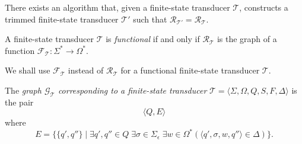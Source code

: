 \begin{proposition}
  There exists an algorithm that, given a finite-state transducer $\mathcal{T}$,
  constructs a trimmed finite-state transducer $\mathcal{T'}$ such that
  $\mathcal{R}_\mathcal{T'} = \mathcal{R}_\mathcal{T}$. 
\end{proposition}

\begin{definition}
  A finite-state transducer $\mathcal{T}$ is \emph{functional} if and only if
  $\mathcal{R}_\mathcal{T}$ is the graph of a function $\mathcal{F}_\mathcal{T} :
  \Sigma^* \rightarrow \Omega^*$.
\end{definition}

We shall use $\mathcal{F}_\mathcal{T}$ instead of $\mathcal{R}_\mathcal{T}$ for a functional finite-state transducer $\mathcal{T}$.

\begin{definition}
  The \emph{graph $\mathcal{G}_{\mathcal{T}}$ corresponding to a finite-state
  transducer} $\mathcal{T} = \langle \Sigma, \Omega, Q, S, F, \Delta \rangle$ is the
  pair
  \begin{equation*}
    \langle Q, E \rangle
  \end{equation*}
  where
  \begin{equation*}
    E = \{ \{ q', q'' \} \mid \exists q', q'' \in Q \; \exists \sigma \in
    \Sigma_\epsilon \; \exists w \in \Omega^* (\langle q', \sigma, w, q'' \rangle
    \in \Delta) \}.
  \end{equation*}
\end{definition}
